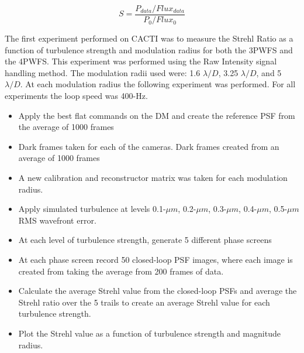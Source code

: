 \documentclass[12pt]{spieman}  %
\begin{document}
\begin{spacing}{2}
\begin{equation}
    S=\frac{P_{data}/Flux_{data}}{P_{0}/Flux_{0}}
    \label{Strehl}
\end{equation}

The first experiment performed on CACTI was to measure the Strehl Ratio as a function of turbulence strength and modulation radius for both the 3PWFS and the 4PWFS.  This experiment was performed using the Raw Intensity signal handling method. The modulation radii used were: 1.6 $\lambda/D$, 3.25 $\lambda/D$, and 5 $\lambda/D$. At each modulation radius the following experiment was performed. For all experiments the loop speed was 400-Hz.

\begin{itemize}
    \item Apply the best flat commands on the DM and create the reference PSF from the average of 1000 frames
    \item Dark frames taken for each of the cameras. Dark frames created from an average of 1000 frames
    \item A new calibration and reconstructor matrix was taken for each modulation radius.
    \item Apply simulated turbulence at levels 0.1-$\mu m$, 0.2-$\mu m$, 0.3-$\mu m$, 0.4-$\mu m$, 0.5-$\mu m$ RMS wavefront error. 
    \item At each level of turbulence strength, generate 5 different phase screens
    \item At each phase screen record 50 closed-loop PSF images, where each image is created from taking the average from 200 frames of data. 
    \item Calculate the average Strehl value from the closed-loop PSFs and average the Strehl ratio over the 5 trails to create an average Strehl value for each turbulence strength.
    \item Plot the Strehl value as a function of turbulence strength and magnitude radius. 
    
\end{itemize}





	
 




\end{spacing}
\end{document}
